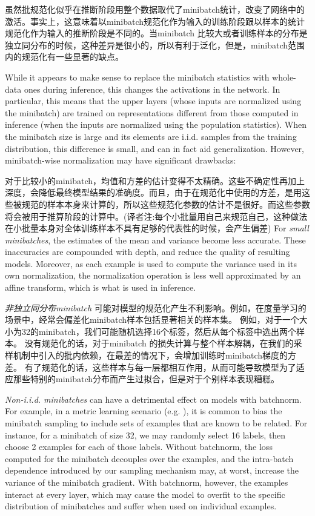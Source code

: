 虽然批规范化似乎在推断阶段用整个数据取代了minibatch统计，改变了网络中的激活。事实上，这意味着以minibatch规范化作为输入的训练阶段跟以样本的统计规范化作为输入的推断阶段是不同的。当minibatch 比较大或者训练样本的分布是独立同分布的时候，这种差异是很小的，所以有利于泛化，但是，minibatch范围内的规范化有一些显著的缺点。

While it appears to make sense to replace the minibatch statistics with whole-data ones during inference, this changes the activations in the network. In particular, this means that the upper layers (whose inputs are normalized using the minibatch) are trained on representations different from those computed in inference (when the inputs are normalized using the population statistics). When the minibatch size is large and its elements are i.i.d. samples from the training distribution, this difference is small, and can in fact aid generalization. However,  minibatch-wise normalization may have significant drawbacks:

对于比较小的minibatch，均值和方差的估计变得不太精确。这些不确定性再加上深度，会降低最终模型结果的准确度。而且，由于在规范化中使用的方差，是用这些被规范的样本本身来计算的，所以这些规范化参数的估计不是很好。而这些参数将会被用于推算阶段的计算中。(译者注:每个小批量用自己来规范自己，这种做法在小批量本身对全体训练样本不具有足够的代表性的时候，会产生偏差)
For {\em small minibatches}, the estimates of the mean and variance become less accurate. These inaccuracies are compounded with depth, and reduce the quality of resulting models. Moreover, as each example is used to compute the variance used in its own normalization, the normalization operation is less well approximated by an affine transform, which is what is used in inference.

{\em 非独立同分布minibatch }可能对模型的规范化产生不利影响。例如，在度量学习的场景中，经常会偏差化minibatch样本包括显著相关的样本集。
例如，对于一个大小为32的minibatch，我们可能随机选择16个标签，然后从每个标签中选出两个样本。
没有规范化的话，对于minibatch 的损失计算与整个样本解耦，在我们的采样机制中引入的批内依赖，在最差的情况下，会增加训练时minibatch梯度的方差。
有了规范化的话，这些样本与每一层都相互作用，从而可能导致模型为了适应那些特别的minibatch分布而产生过拟合，但是对于个别样本表现糟糕。

{\em Non-i.i.d. minibatches} can have a detrimental effect on models with batchnorm. For example, in a metric learning scenario (e.g. \cite{nca}), it is common to bias the minibatch sampling to include sets of examples that are known to be related. For instance, for a minibatch of size 32, we may randomly select 16 labels, then choose 2 examples for each of those labels. Without batchnorm, the loss computed for the minibatch decouples over the examples, and the intra-batch dependence introduced by our sampling mechanism may, at worst, increase the variance of the minibatch gradient. With batchnorm, however, the examples interact at every layer, which may cause the model to overfit to the specific distribution of minibatches and suffer when used on individual examples.

